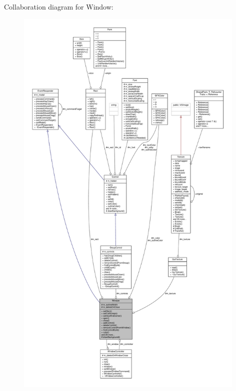 Collaboration diagram for Window\+:
\nopagebreak
\begin{figure}[H]
\begin{center}
\leavevmode
\includegraphics[height=550pt]{d5/d01/classWindow__coll__graph}
\end{center}
\end{figure}
